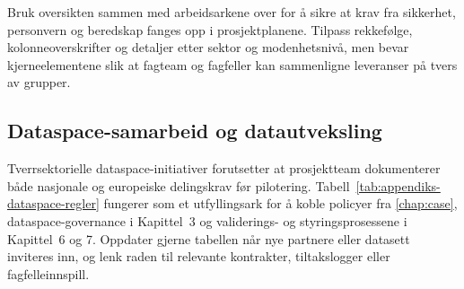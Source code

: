Bruk oversikten sammen med arbeidsarkene over for å sikre at krav fra sikkerhet, personvern og
beredskap fanges opp i prosjektplanene. Tilpass rekkefølge, kolonneoverskrifter og detaljer etter
sektor og modenhetsnivå, men bevar kjerneelementene slik at fagteam og fagfeller kan sammenligne
leveranser på tvers av grupper.

\subsection{Dataspace-samarbeid og datautveksling}
Tverrsektorielle dataspace-initiativer forutsetter at prosjektteam dokumenterer både nasjonale og
europeiske delingskrav før pilotering. Tabell~\ref{tab:appendiks-dataspace-regler} fungerer som et
utfyllingsark for å koble policyer fra \autoref{chap:case}, dataspace-governance i Kapittel~3 og
validerings- og styringsprosessene i Kapittel~6 og \nobreakspace{}7. Oppdater gjerne tabellen når nye
partnere eller datasett inviteres inn, og lenk raden til relevante kontrakter, tiltakslogger eller
fagfelleinnspill.

